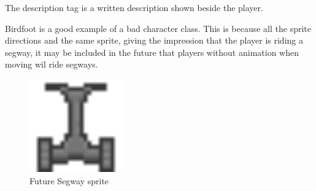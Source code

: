 \documentclass{book}
\begin{document}
The description tag is a written description shown beside the player.

Birdfoot is a good example of a bad character class. This is because all the sprite directions and the same sprite, giving the impression that the player is riding a segway, it may be included in the future that players without animation when moving wil ride segways.

\begin{figure}[ht!]
		\centering
		\includegraphics[width=40mm]{Nice_Segway.png}
		\caption{Future Segway sprite}
\end{figure}
\end{document}
